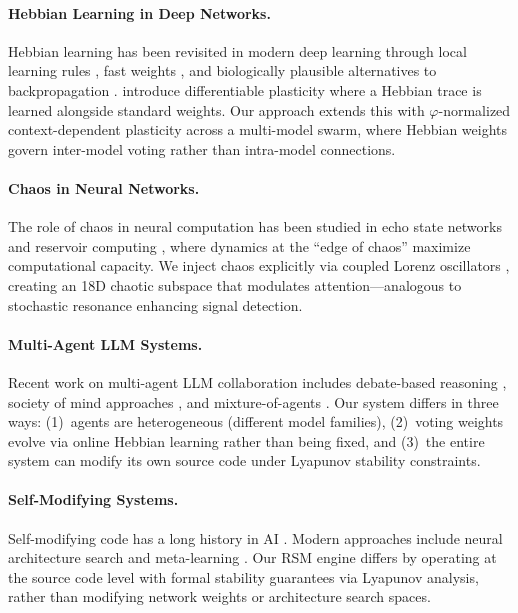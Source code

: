 \documentclass[11pt,a4paper]{article}
\begin{document}
\paragraph{Hebbian Learning in Deep Networks.}
Hebbian learning has been revisited in modern deep learning through local learning rules \citep{miconi2018differentiable,najarro2020meta}, fast weights \citep{schlag2021linear}, and biologically plausible alternatives to backpropagation \citep{lillicrap2020backpropagation}. \citet{miconi2018differentiable} introduce differentiable plasticity where a Hebbian trace is learned alongside standard weights. Our approach extends this with $\varphi$-normalized context-dependent plasticity across a multi-model swarm, where Hebbian weights govern inter-model voting rather than intra-model connections.

\paragraph{Chaos in Neural Networks.}
The role of chaos in neural computation has been studied in echo state networks \citep{jaeger2004harnessing} and reservoir computing \citep{lukosevicius2009reservoir}, where dynamics at the ``edge of chaos'' maximize computational capacity. We inject chaos explicitly via coupled Lorenz oscillators \citep{lorenz1963deterministic}, creating an 18D chaotic subspace that modulates attention---analogous to stochastic resonance enhancing signal detection.

\paragraph{Multi-Agent LLM Systems.}
Recent work on multi-agent LLM collaboration includes debate-based reasoning \citep{du2023improving}, society of mind approaches \citep{park2023generative}, and mixture-of-agents \citep{wang2024mixture}. Our system differs in three ways: (1)~agents are heterogeneous (different model families), (2)~voting weights evolve via online Hebbian learning rather than being fixed, and (3)~the entire system can modify its own source code under Lyapunov stability constraints.

\paragraph{Self-Modifying Systems.}
Self-modifying code has a long history in AI \citep{schmidhuber1993self}. Modern approaches include neural architecture search \citep{zoph2017neural} and meta-learning \citep{finn2017model}. Our RSM engine differs by operating at the source code level with formal stability guarantees via Lyapunov analysis, rather than modifying network weights or architecture search spaces.
\end{document}
